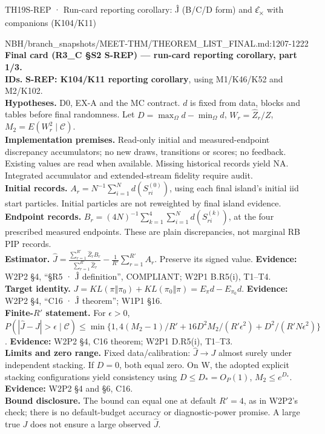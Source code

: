 \begin{card}{TH19}{S-REP · Run-card reporting corollary: Ĵ (B/C/D form) and ε̂\textsubscript{×} with companions (K104/K11)}
\begin{stmt}{NBH/branch_snapshots/MEET-THM/THEOREM_LIST_FINAL.md:1207-1222}
\textbf{Final card (R3\_C §S2 S-REP) — run-card reporting corollary, part 1/3.}\\
\textbf{IDs.} \textbf{S-REP: K104/K11 reporting corollary}, using M1/K46/K52 and M2/K102.\\
\textbf{Hypotheses.} D0, EX-A and the MC contract. $d$ is fixed from data, blocks and tables before final randomness. Let $D=\max_\Omega d-\min_\Omega d$, $W_r=\widehat Z_r/Z$, $M_2=E(W_r^2\mid\mathcal C)$.\\
\textbf{Implementation premises.} Read-only initial and measured-endpoint discrepancy accumulators; no new draws, transitions or scores; no feedback. Existing values are read when available. Missing historical records yield NA. Integrated accumulator and extended-stream fidelity require audit.\\
\textbf{Initial records.} $A_r=N^{-1}\sum_{i=1}^Nd(S^{(0)}_{ri})$, using each final island’s initial iid start particles. Initial particles are not reweighted by final island evidence.\\
\textbf{Endpoint records.} $B_r=(4N)^{-1}\sum_{k=1}^4\sum_{i=1}^Nd(S^{(k)}_{ri})$, at the four prescribed measured endpoints. These are plain discrepancies, not marginal RB PIP records.\\
\textbf{Estimator.} $\displaystyle\widehat J=\frac{\sum_{r=1}^{R'}\widehat Z_rB_r}{\sum_{r=1}^{R'}\widehat Z_r}-\frac1{R'}\sum_{r=1}^{R'}A_r.$ Preserve its signed value. \textbf{Evidence:} W2P2 §4, “§R5 · Ĵ definition”, COMPLIANT; W2P1 B.R5(i), T1–T4.\\
\textbf{Target identity.} $J=KL(\pi\Vert\pi_0)+KL(\pi_0\Vert\pi)=E_\pi d-E_{\pi_0}d$. \textbf{Evidence:} W2P2 §4, “C16 · Ĵ theorem”; W1P1 §16.\\
\textbf{Finite-$R'$ statement.} For $\epsilon>0$, $P(|\widehat J-J|>\epsilon\mid\mathcal C)\le\min\{1,4(M_2-1)/R'+16D^2M_2/(R'\epsilon^2)+D^2/(R'N\epsilon^2)\}$. \textbf{Evidence:} W2P2 §4, C16 theorem; W2P1 D.R5(i), T1–T3.\\
\textbf{Limits and zero range.} Fixed data/calibration: $\widehat J\to J$ almost surely under independent stacking. If $D=0$, both equal zero. On W, the adopted explicit stacking configurations yield consistency using $D\le D_*=O_P(1)$, $M_2\le e^{D_*}$. \textbf{Evidence:} W2P2 §4 and §6, C16.\\
\textbf{Bound disclosure.} The bound can equal one at default $R'=4$, as in W2P2’s check; there is no default-budget accuracy or diagnostic-power promise. A large true $J$ does not ensure a large observed $\widehat J$.\\

\end{stmt}
\end{card}
